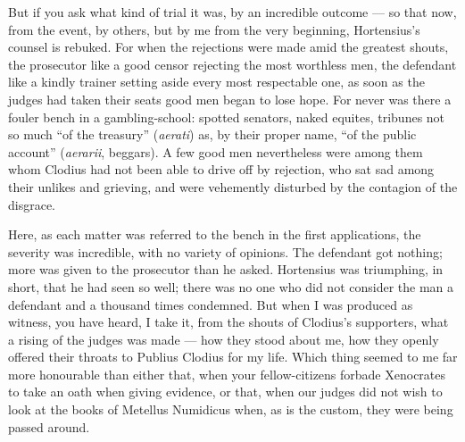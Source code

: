  But if you ask what kind of trial it was, by an incredible outcome --- so that now, from the event, by others, but by me from the very beginning, Hortensius's counsel is rebuked. For when the rejections were made amid the greatest shouts, the prosecutor like a good censor rejecting the most worthless men, the defendant like a kindly trainer setting aside every most respectable one, as soon as the judges had taken their seats good men began to lose hope. For never was there a fouler bench in a gambling-school: spotted senators, naked equites, tribunes not so much ``of the treasury'' (\textit{aerati}) as, by their proper name, ``of the public account'' (\textit{aerarii}, beggars). A few good men nevertheless were among them whom Clodius had not been able to drive off by rejection, who sat sad among their unlikes and grieving, and were vehemently disturbed by the contagion of the disgrace.

 Here, as each matter was referred to the bench in the first applications, the severity was incredible, with no variety of opinions. The defendant got nothing; more was given to the prosecutor than he asked. Hortensius was triumphing, in short, that he had seen so well; there was no one who did not consider the man a defendant and a thousand times condemned. But when I was produced as witness, you have heard, I take it, from the shouts of Clodius's supporters, what a rising of the judges was made --- how they stood about me, how they openly offered their throats to Publius Clodius for my life. Which thing seemed to me far more honourable than either that, when your fellow-citizens forbade Xenocrates to take an oath when giving evidence, or that, when our judges did not wish to look at the books of Metellus Numidicus when, as is the custom, they were being passed around.

